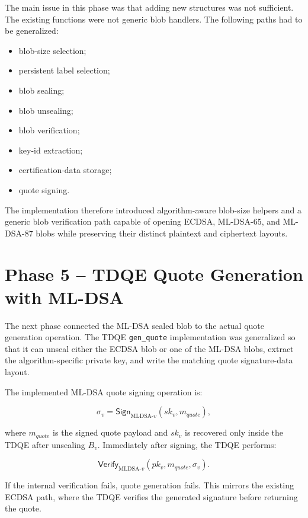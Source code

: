 The main issue in this phase was that adding new structures was not sufficient.
The existing functions were not generic blob handlers. The following paths had
to be generalized:

\begin{itemize}
  \item blob-size selection;
  \item persistent label selection;
  \item blob sealing;
  \item blob unsealing;
  \item blob verification;
  \item key-id extraction;
  \item certification-data storage;
  \item quote signing.
\end{itemize}

The implementation therefore introduced algorithm-aware blob-size helpers and
a generic blob verification path capable of opening ECDSA, ML-DSA-65, and
ML-DSA-87 blobs while preserving their distinct plaintext and ciphertext
layouts.

\section{Phase 5 -- TDQE Quote Generation with ML-DSA}

The next phase connected the ML-DSA sealed blob to the actual quote generation
operation. The TDQE \texttt{gen\_quote} implementation was generalized so that
it can unseal either the ECDSA blob or one of the ML-DSA blobs, extract the
algorithm-specific private key, and write the matching quote signature-data
layout.

The implemented ML-DSA quote signing operation is:

\begin{equation}
  \sigma_v = \mathsf{Sign}_{\mathrm{MLDSA}\mbox{-}v}(sk_v, m_{quote}),
\end{equation}

where \(m_{quote}\) is the signed quote payload and \(sk_v\) is recovered only
inside the TDQE after unsealing \(B_v\). Immediately after signing, the TDQE
performs:

\begin{equation}
  \mathsf{Verify}_{\mathrm{MLDSA}\mbox{-}v}(pk_v, m_{quote}, \sigma_v).
\end{equation}

If the internal verification fails, quote generation fails. This mirrors the
existing ECDSA path, where the TDQE verifies the generated signature before
returning the quote.

